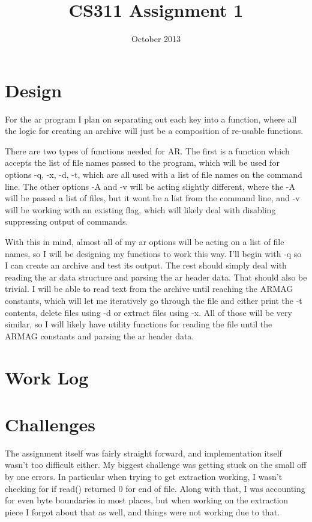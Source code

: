 \documentclass[letterpaper,10pt]{article}
\title{CS311 Assignment 1}
\author{\name}
\date{October 2013}
\begin{document}
\maketitle

\section{Design}

For the ar program I plan on separating out each key into a function, where all
the logic for creating an archive will just be a composition of re-usable
functions.

There are two types of functions needed for AR. The first is a function which
accepts the list of file names passed to the program, which will be used for
options -q, -x, -d, -t, which are all used with a list of file names on the
command line. The other options -A and -v will be acting slightly different,
where the -A will be passed a list of files, but it wont be a list from the
command line, and -v will be working with an existing flag, which will likely
deal with disabling suppressing output of commands.

With this in mind, almost all of my ar options will be acting on a list of file
names, so I will be designing my functions to work this way. I'll begin with -q
so I can create an archive and test its output. The rest should simply deal
with reading the ar data structure and parsing the ar header data. That should
also be trivial. I will be able to read text from the archive until reaching
the ARMAG constants, which will let me iteratively go through the file and
either print the -t contents, delete files using -d or extract files using -x.
All of those will be very similar, so I will likely have utility functions for
reading the file until the ARMAG constants and parsing the ar header data.

\section{Work Log}


\section{Challenges}
The assignment itself was fairly straight forward, and implementation itself
wasn't too difficult either. My biggest challenge was getting stuck on the
small off by one errors. In particular when trying to get extraction working, I
wasn't checking for if read() returned 0 for end of file. Along with that, I
was accounting for even byte boundaries in most places, but when working on the
extraction piece I forgot about that as well, and things were not working due
to that.
\end{document}
